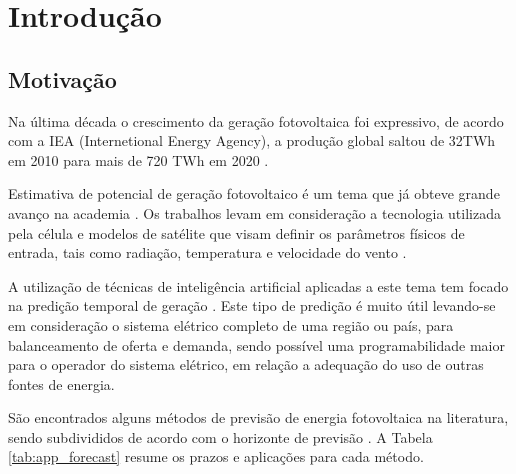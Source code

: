 \chapter{Introdução}\label{cap:introducao}

\section{Motivação}

Na última década o crescimento da geração fotovoltaica foi expressivo, de acordo com a IEA (Internetional Energy Agency), a produção global saltou de 32TWh em 2010 para mais de 720 TWh em 2020 \cite{ieasolarpvontrack2020}. 

Estimativa de potencial de geração fotovoltaico é um tema que já obteve grande avanço na academia \cite{chin2015cell, jordehi2016parameter, de2017performance}. Os trabalhos levam em consideração a tecnologia utilizada pela célula e modelos de satélite que visam definir os parâmetros físicos de entrada, tais como radiação, temperatura e velocidade do vento \cite{mueller2009cm, huld2012new, amillo2014new, habte2017evaluation}.

A utilização de técnicas de inteligência artificial aplicadas a este tema tem focado na predição temporal de geração \cite{voyant2017machine, wolff2016statistical, li2016hierarchical}. Este tipo de predição é muito útil levando-se em consideração o sistema elétrico completo de uma região ou país, para balanceamento de oferta e demanda, sendo possível uma programabilidade maior para o operador do sistema elétrico, em relação a adequação do uso de outras fontes de energia.

São encontrados alguns métodos de previsão de energia fotovoltaica na literatura, sendo subdivididos de acordo com o horizonte de previsão \cite{mellit2020advanced}. A Tabela \ref{tab:app_forecast} resume os prazos e aplicações para cada método.

